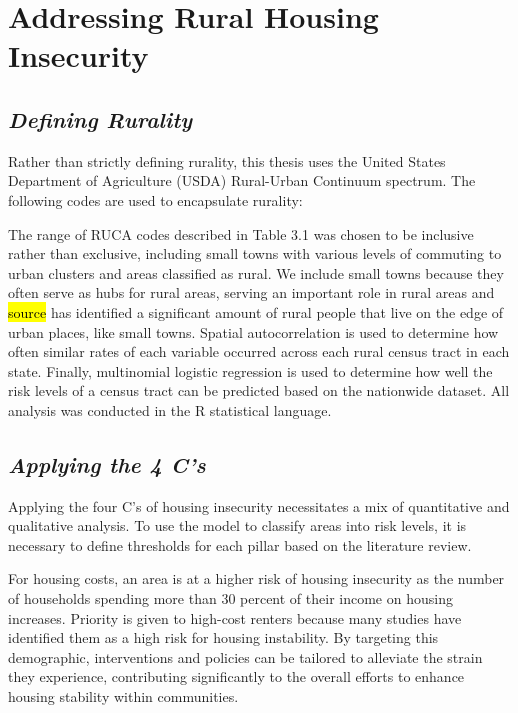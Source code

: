 \chapter{Addressing Rural Housing Insecurity}	%

\section{\textit{Defining Rurality}}
Rather than strictly defining rurality, this thesis uses the United States Department of Agriculture (USDA) Rural-Urban Continuum spectrum. The following codes are used to encapsulate rurality:




The range of RUCA codes described in Table 3.1 was chosen to be inclusive rather than exclusive, including small towns with various levels of commuting to urban clusters and areas classified as rural. We include small towns because they often serve as hubs for rural areas, serving an important role in rural areas and \hl{source} has identified a significant amount of rural people that live on the edge of urban places, like small towns. Spatial autocorrelation is used to determine how often similar rates of each variable occurred across each rural census tract in each state. Finally, multinomial logistic regression is used to determine how well the risk levels of a census tract can be predicted based on the nationwide dataset.  All analysis was conducted in the R statistical language.  

\section{\textit{Applying the 4 C's}}
Applying the four C's of housing insecurity necessitates a mix of quantitative and qualitative analysis. To use the model to classify areas into risk levels, it is necessary to define thresholds for each pillar based on the literature review. 

For housing costs, an area is at a higher risk of housing insecurity as the number of households spending more than 30 percent of their income on housing increases. Priority is given to high-cost renters because many studies have identified them as a high risk for housing instability. By targeting this demographic, interventions and policies can be tailored to alleviate the strain they experience, contributing significantly to the overall efforts to enhance housing stability within communities.

